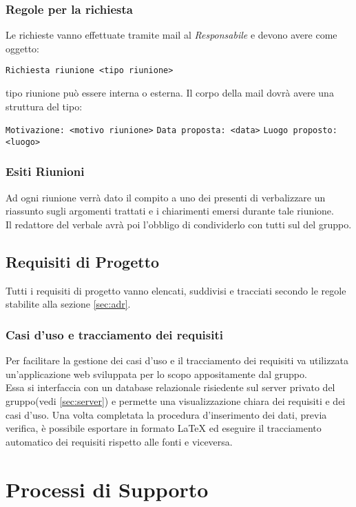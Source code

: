 \documentclass{scalatekids-article}
\begin{document}
\subsubsection{Regole per la richiesta}
\label{sec:RegoleRichiesta}
Le richieste vanno effettuate tramite mail al \textit{Responsabile} e devono avere come oggetto:
\begin{center}
  \verb=Richiesta riunione <tipo riunione>=
\end{center}
tipo riunione può essere interna o esterna.
Il corpo della mail dovrà avere una struttura del tipo:
\begin{center}
  \verb=Motivazione: <motivo riunione>=
  \verb=Data proposta: <data>=
  \verb=Luogo proposto: <luogo>=
\end{center}

\subsubsection{Esiti Riunioni}
Ad ogni riunione verrà dato il compito a uno dei presenti di verbalizzare un riassunto sugli argomenti trattati e i chiarimenti emersi durante tale riunione.\\
Il redattore del verbale avrà poi l'obbligo di condividerlo con tutti sul  del gruppo.

\subsection{Requisiti di Progetto}
Tutti i requisiti di progetto vanno elencati, suddivisi e tracciati secondo le regole stabilite alla sezione \ref{sec:adr}.
\subsubsection{Casi d'uso e tracciamento dei requisiti}
\label{sec:front-end}
Per facilitare la gestione dei casi d'uso e il tracciamento dei requisiti
va utilizzata un'applicazione web sviluppata per lo scopo appositamente dal
gruppo.\\Essa si interfaccia con un database relazionale risiedente sul server
privato del gruppo(vedi \ref{sec:server}) e permette una visualizzazione chiara dei
requisiti e dei casi d'uso. Una volta completata la procedura d'inserimento dei
dati, previa verifica, è possibile esportare in formato
\LaTeX\xspace ed eseguire il tracciamento automatico dei requisiti rispetto alle
fonti e viceversa.

\section{Processi di Supporto}
\end{document}
